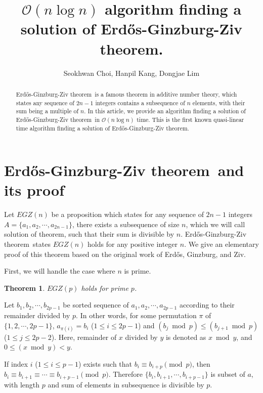 \documentclass[11pt]{article}
\newtheorem{theorem}{Theorem}
\newcommand{\EGZT}{Erd\H{o}s-Ginzburg-Ziv theorem}
\begin{document}
\title{$\mathcal{O}(n \log n)$ algorithm finding a solution of Erdős-Ginzburg-Ziv theorem.}
 
\author{Seokhwan Choi, Hanpil Kang, Dongjae Lim}
\maketitle
\setcounter{page}{1}

\begin{abstract}
    \EGZT\ is a famous theorem in additive number theory, which states any sequence of $2n-1$ integers contains a subsequence of $n$ elements, with their sum being a multiple of $n$. In this article, we provide an algorithm finding a solution of \EGZT\ in $\mathcal{O}(n \log n)$ time. This is the first known quasi-linear time algorithm finding a solution of \EGZT.
\end{abstract}


\section{\EGZT\ and its proof}

Let $EGZ(n)$ be a proposition which states for any sequence of $2n-1$ integers $A = \{{a}_{1}, {a}_{2}, \cdots, {a}_{2n-1}\}$, there exists a subsequence of size $n$, which we will call solution of theorem, such that their sum is divisible by $n$. \EGZT\ states $EGZ(n)$ holds for any positive integer $n$. \cite{1zbMATH03102822} We give an elementary proof of this theorem based on the original work of Erd\H{o}s, Ginzburg, and Ziv. 



First, we will handle the case where $n$ is prime.

\begin{theorem}
$EGZ(p)$ holds for prime $p$.
\end{theorem}

Let $b_1, b_2, \cdots, b_{2p-1}$ be sorted sequence of $a_1, a_2, \cdots, a_{2p-1}$ according to their remainder divided by $p$. In other words, for some permutation $\pi$ of $\{1, 2, \cdots, 2p-1\}$, $a_{\pi(i)} = b_i$ ($1 \le i \le 2p-1$) and $(b_j \bmod p) \le (b_{j+1} \bmod p)$ ($1 \le j \le 2p-2$). Here, remainder of $x$ divided by $y$ is denoted as $x \bmod y$, and $0 \le (x \bmod y) < y$.

If index $i$ ($1 \le i \le p-1$) exists such that $b_{i} \equiv b_{i+p} \pmod{p}$, then $b_{i} \equiv b_{i+1} \equiv \cdots \equiv b_{i+p-1} \pmod{p}$. Therefore $\{b_i, b_{i+1}, \cdots, b_{i+p-1}\}$ is subset of $a$, with length $p$ and sum of elements in subsequence is divisible by $p$.
\end{document}
